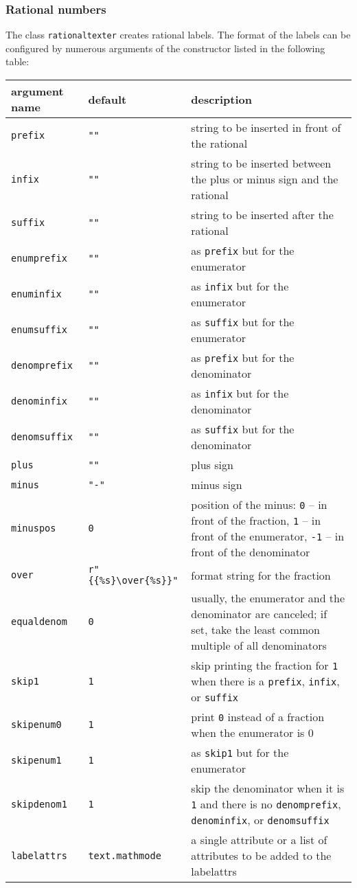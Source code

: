 \subsubsection{Rational numbers}

The class \verb|rationaltexter| creates rational labels. The format of
the labels can be configured by numerous arguments of the constructor
listed in the following table:

\medskip
\begin{tabularx}{\linewidth}{ll>{\raggedright\arraybackslash}X}
argument name&default&description\\
\hline
\texttt{prefix}&\texttt{""}&string to be inserted in front of the rational\\
\texttt{infix}&\texttt{""}&string to be inserted between the plus or minus sign and the rational\\
\texttt{suffix}&\texttt{""}&string to be inserted after the rational\\
\texttt{enumprefix}&\texttt{""}&as \texttt{prefix} but for the enumerator\\
\texttt{enuminfix}&\texttt{""}&as \texttt{infix} but for the enumerator\\
\texttt{enumsuffix}&\texttt{""}&as \texttt{suffix} but for the enumerator\\
\texttt{denomprefix}&\texttt{""}&as \texttt{prefix} but for the denominator\\
\texttt{denominfix}&\texttt{""}&as \texttt{infix} but for the denominator\\
\texttt{denomsuffix}&\texttt{""}&as \texttt{suffix} but for the denominator\\
\texttt{plus}&\texttt{""}&plus sign\\
\texttt{minus}&\texttt{"-"}&minus sign\\
\texttt{minuspos}&\texttt{0}&position of the minus: \texttt{0} -- in front of the fraction, \texttt{1} -- in front of the enumerator, \texttt{-1} -- in front of the denominator\\
\texttt{over}&\texttt{r"\{\{\%s\}\textbackslash over\{\%s\}\}"}&format string for the fraction\\
\texttt{equaldenom}&\texttt{0}&usually, the enumerator and the denominator are canceled; if set, take the least common multiple of all denominators\\
\texttt{skip1}&\texttt{1}&skip printing the fraction for \texttt{1} when there is a \texttt{prefix}, \texttt{infix}, or \texttt{suffix}\\
\texttt{skipenum0}&\texttt{1}&print \texttt{0} instead of a fraction when the enumerator is 0\\
\texttt{skipenum1}&\texttt{1}&as \texttt{skip1} but for the enumerator\\
\texttt{skipdenom1}&\texttt{1}&skip the denominator when it is \texttt{1} and there is no \texttt{denomprefix}, \texttt{denominfix}, or \texttt{denomsuffix}\\
\texttt{labelattrs}&\texttt{text.mathmode}&a single attribute or a list of attributes to be added to the labelattrs\\
\end{tabularx}
\medskip

